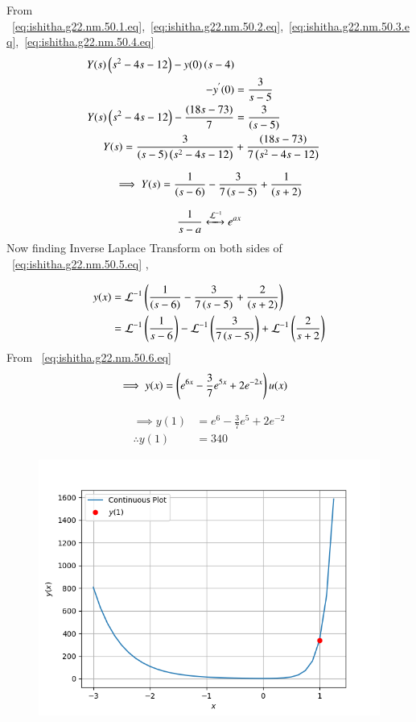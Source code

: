 \documentclass[journal,12pt,twocolumn]{IEEEtran}
\theoremstyle{remark}
\begin{document}
From ~\eqref{eq:ishitha.g22.nm.50.1.eq},~\eqref{eq:ishitha.g22.nm.50.2.eq},~\eqref{eq:ishitha.g22.nm.50.3.eq},~\eqref{eq:ishitha.g22.nm.50.4.eq}
\begin{align}
Y(s)\left(s^{2}-4s-12\right) -y(0)\left(s-4\right) \nonumber \\-y^{'}(0) &= \frac{3}{s-5} \\
Y(s)\left(s^{2}-4s-12\right) - \frac{\left(18s -73 \right)}{7}  &=\frac{3}{(s-5)} \\
Y(s) = \frac{3}{(s-5)\left(s^{2}-4s-12\right)} &+ \frac{\left(18s -73 \right)}{7\left(s^{2}-4s-12\right) } 
\end{align}

\begin{equation}
\implies Y(s) = \frac{1}{\left(s-6\right)} -\frac{3}{7\left(s-5\right)} + \frac{1}{\left(s+2\right)} \\ \label{eq:ishitha.g22.nm.50.5.eq}
\end{equation}


\begin{equation}
\frac{1}{s-a}   \xleftrightarrow {\mathcal{L}^{-1}} e^{ax}  \\ \label{eq:ishitha.g22.nm.50.6.eq}
\end{equation}
Now finding Inverse Laplace Transform on both sides of ~\eqref{eq:ishitha.g22.nm.50.5.eq} ,

\begin{align}
y(x)&=\mathcal{L}^{-1}\left(\frac{1}{\left(s-6\right)} -\frac{3}{7\left(s-5\right)} + \frac{2}{\left(s+2\right)} \right) \\
&= \mathcal{L}^{-1}\left(\frac{1}{s-6}\right) - \mathcal{L}^{-1}\left(\frac{3}{7\left(s-5\right)}\right) +\mathcal{L}^{-1}\left(\frac{2}{s+2}\right) 
\end{align}
From ~\eqref{eq:ishitha.g22.nm.50.6.eq}
\begin{align}
\implies y(x) &= \left(e^{6x} -\frac{3}{7}e^{5x} + 2e^{-2x}\right)u(x)
\end{align}

\begin{align}
\implies y(1) &= e^{6} -\frac{3}{7}e^{5} + 2e^{-2} \\
\therefore y(1) &= 340
\end{align}

\begin{figure}[!ht]
    \centering
     \includegraphics[width=\columnwidth]{./figs/g50fig1.png}
    \caption{}    
    \label{fig:ishitha.g22.nm.50.f2}
\end{figure}
\end{document}
